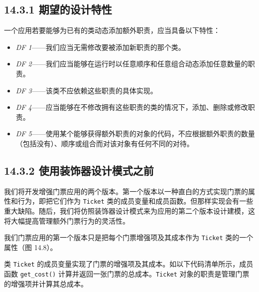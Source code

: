 \subsection{14.3.1 期望的设计特性}

一个应用若要能够为已有的类动态添加额外职责，应当具备以下特性：

\begin{itemize}
\item \emph{DF 1}——我们应当无需修改要被添加新职责的那个类。
\item \emph{DF 2}——我们应当能够在运行时以任意顺序和任意组合动态添加任意数量的职责。
\item \emph{DF 3}——该类不应依赖这些职责的具体实现。
\item \emph{DF 4}——应当能够在不修改拥有这些职责的类的情况下，添加、删除或修改职责。
\item \emph{DF 5}——使用某个能够获得额外职责的对象的代码，不应根据额外职责的数量（包括没有）、顺序或组合而对该对象有任何不同的对待。
\end{itemize}

\subsection{14.3.2 使用装饰器设计模式之前}

我们将开发增强门票应用的两个版本。第一个版本以一种直白的方式实现门票的属性和行为，即把它们作为 \texttt{Ticket} 类的成员变量和成员函数。但那样实现会有一些重大缺陷。随后，我们将仿照装饰器设计模式来为应用的第二个版本设计建模，这将大幅提高管理额外门票行为的灵活性。

我们门票应用的第一个版本只是把每个门票增强项及其成本作为 \texttt{Ticket} 类的一个属性（图 14.8）。


类 \texttt{Ticket} 的成员变量实现了门票的增强项及其成本。如以下代码清单所示，成员函数 \texttt{get\_\allowbreak{}cost(\allowbreak{})\allowbreak{}} 计算并返回一张门票的总成本。\texttt{Ticket} 对象的职责是管理门票的增强项并计算其总成本。

